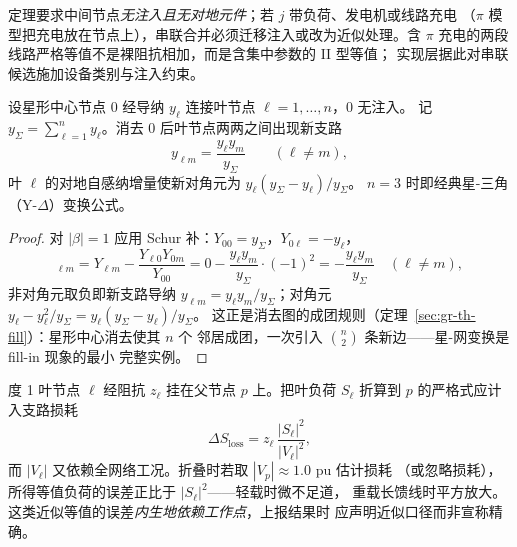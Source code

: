 \begin{remark}[串联等值的适用边界]
定理要求中间节点\emph{无注入且无对地元件}；若 $j$ 带负荷、发电机或线路充电
（$\pi$ 模型把充电放在节点上），串联合并必须迁移注入或改为近似处理。含
$\pi$ 充电的两段线路严格等值不是裸阻抗相加，而是含集中参数的 II 型等值；
实现层据此对串联候选施加设备类别与注入约束。
\end{remark}

\begin{proposition}\label{sec:gr-th-starmesh}
设星形中心节点 $0$ 经导纳 $y_\ell$ 连接叶节点 $\ell=1,\dots,n$，$0$ 无注入。
记 $y_\Sigma=\sum_{\ell=1}^n y_\ell$。消去 $0$ 后叶节点两两之间出现新支路
\begin{equation}
y_{\ell m}=\frac{y_\ell y_m}{y_\Sigma}\qquad(\ell\ne m),
\end{equation}
叶 $\ell$ 的对地自感纳增量使新对角元为 $y_\ell(y_\Sigma-y_\ell)/y_\Sigma$。
$n=3$ 时即经典星-三角（Y-$\Delta$）变换公式。
\end{proposition}
\begin{proof}
对 $|\beta|=1$ 应用 Schur 补：$Y_{00}=y_\Sigma$，$Y_{0\ell}=-y_\ell$，
\begin{equation}
[Y_{red}]_{\ell m}=Y_{\ell m}-\frac{Y_{\ell 0}Y_{0m}}{Y_{00}}
=0-\frac{y_\ell y_m}{y_\Sigma}\cdot(-1)^{2}
=-\frac{y_\ell y_m}{y_\Sigma}\quad(\ell\ne m),
\end{equation}
非对角元取负即新支路导纳 $y_{\ell m}=y_\ell y_m/y_\Sigma$；对角元
$y_\ell-y_\ell^2/y_\Sigma=y_\ell(y_\Sigma-y_\ell)/y_\Sigma$。
这正是消去图的成团规则（定理~\ref{sec:gr-th-fill}）：星形中心消去使其 $n$ 个
邻居成团，一次引入 $\binom{n}{2}$ 条新边——星-网变换是 fill-in 现象的最小
完整实例。
\end{proof}

\begin{remark}[悬垂折叠的近似性与工作点依赖]
度 1 叶节点 $\ell$ 经阻抗 $z_\ell$ 挂在父节点 $p$ 上。把叶负荷 $S_\ell$ 折算到
$p$ 的严格式应计入支路损耗
\begin{equation}
\Delta S_{\mathrm{loss}}=z_\ell\,\frac{|S_\ell|^2}{|V_\ell|^2},
\end{equation}
而 $|V_\ell|$ 又依赖全网络工况。折叠时若取 $|V_p|\approx1.0$ pu 估计损耗
（或忽略损耗），所得等值负荷的误差正比于 $|S_\ell|^2$——轻载时微不足道，
重载长馈线时平方放大。这类近似等值的误差\emph{内生地依赖工作点}，上报结果时
应声明近似口径而非宣称精确。
\end{remark}

